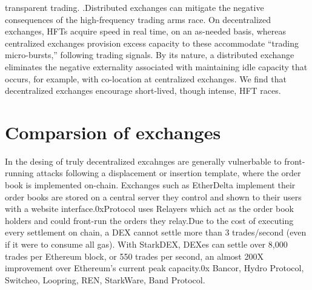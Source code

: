\documentclass{article}
\begin{document}
transparent trading. \cite{8606010}.Distributed exchanges can mitigate the negative consequences of the
high-frequency trading arms race. On decentralized exchanges, HFTs acquire speed in real time, on
an as-needed basis, whereas centralized exchanges provision excess capacity to these accommodate
“trading micro-bursts,” following trading signals. By its nature, a distributed exchange eliminates
the negative externality associated with maintaining idle capacity that occurs, for example, with
co-location at centralized exchanges. We find that decentralized exchanges encourage short-lived,
though intense, HFT races.\cite{brolley2019liquid}




\section{Comparsion of exchanges}
In the desing of truly decentralized excahnges are generally vulnerbable to front-running attacks following a displacement or insertion template, where the order book is implemented on-chain.
Exchanges such as EtherDelta implement their order books are stored on a central
server they control and shown to their users with a website interface.0xProtocol uses Relayers which act as the
order book holders and could front-run the orders they relay.Due to the cost of executing every settlement on chain, a DEX cannot settle more than 3 trades/second (even if it were to consume all gas). With StarkDEX, DEXes can settle over 8,000 trades per Ethereum block, or 550 trades per second, an almost 200X improvement over Ethereum’s current peak capacity.0x
Bancor\cite{Bancor}, Hydro Protocol, Switcheo, Loopring, REN, StarkWare, Band Protocol.
\label{sec:headings}
\begin{table}[]
\centering\renewcommand{\arraystretch}{1.2}
 \caption{Comparison of DEX and CX}
  \centering
{}
\end{table}
\end{document}
